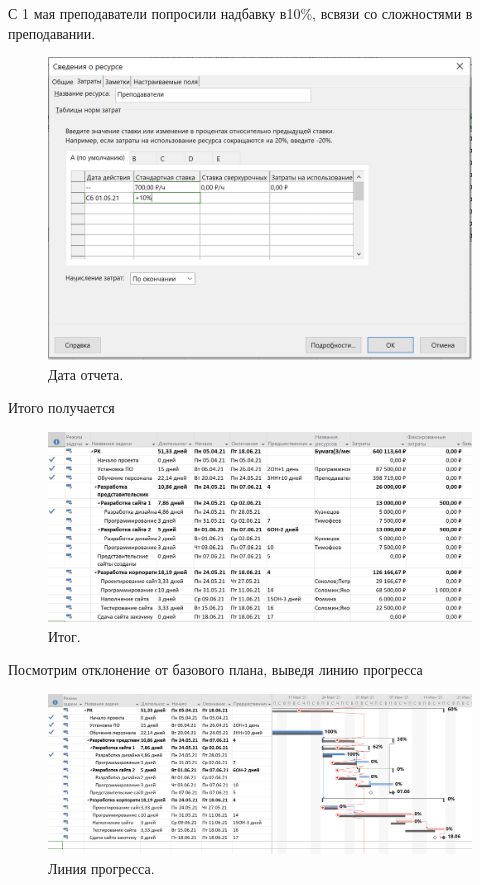 \documentclass[a4paper,14pt]{extreport} %
\begin{document}
\begin{enumerate}
С 1 мая преподаватели попросили надбавку в10\%, всвязи со сложностями в преподавании.

\begin{figure}[H]
  \centering
  \caption{Дата отчета. }
  \includegraphics[scale=0.7]{24}
\end{figure}

Итого получается

\begin{figure}[H]
  \centering
  \caption{Итог. }
  \includegraphics[scale=0.5]{25}
\end{figure}

Посмотрим отклонение от базового плана, выведя линию прогресса

\begin{figure}[H]
  \centering
  \caption{Линия прогресса. }
  \includegraphics[scale=0.5]{26}
\end{figure}


\end{enumerate}
\end{document}
